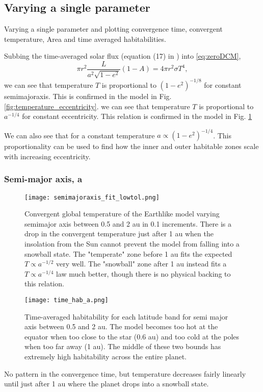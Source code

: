 \documentclass[12pt, onecolumn]{revtex4-2}    %
\begin{document}
\subsection{Varying a single parameter} \label{sec:single_param}

Varying a single parameter and plotting convergence time, convergent temperature, Area and time averaged habitabilities.

Subbing the time-averaged solar flux (equation (17) in \cite{Mendez2017}) into \ref{eq:zeroDCM},
\begin{equation}
    \pi r^2 \frac{L}{a^2 \sqrt{1-e^2}} (1-A) = 4\pi r^2 \sigma T^4,
    \label{eq:Temp_eccent}
\end{equation}
we can see that temperature $T$ is proportional to $(1-e^2)^{-1/8}$ for constant semimajoraxis. This is confirmed in the model in Fig. \ref{fig:temperature_eccentricity}.
we can see that temperature $T$ is proportional to $a^{-1/4}$ for constant eccentricity. This relation is confirmed in the model in Fig. \ref{fig:temperature_semimajoraxis}

We can also see that for a constant temperature $a \propto (1-e^2)^{-1/4}$.
This proportionality can be used to find how the inner and outer habitable zones scale with increasing eccentricity.

\subsubsection*{Semi-major axis, a}
\begin{figure}
    \texttt{[image: semimajoraxis\_fit\_lowtol.png]}
    \caption{Convergent global temperature of the Earthlike model varying semimajor axis between 0.5 and 2 au in 0.1 increments.
        There is a drop in the convergent temperature just after 1 au when the insolation from the Sun cannot prevent the model from falling into a snowball state.
        The "temperate" zone before 1 au fits the expected $T\propto a^{-1/2}$ very well.
        The "snowball" zone after 1 au instead fits a $T\propto a^{-1/4}$ law much better, though there is no physical backing to this relation.}
    \label{fig:temperature_semimajoraxis}
\end{figure}
\begin{figure}
    \texttt{[image: time\_hab\_a.png]}
    \caption{
        Time-averaged habitability for each latitude band for semi major axis between 0.5 and 2 au.
        The model becomes too hot at the equator when too close to the star (0.6 au) and too cold at the poles when too far away (1 au).
        The middle of these two bounds has extremely high habitability across the entire planet.
    }
\end{figure}
No pattern in the convergence time, but temperature decreases fairly linearly until just after 1 au where the planet drops into a snowball state.
\end{document}
